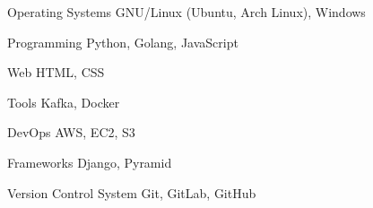 

\begin{cvskills}

  \cvskill
    {Operating Systems} %
    {GNU/Linux (Ubuntu, Arch Linux), Windows } %

  \cvskill
    {Programming} %
    {Python, Golang, JavaScript} %

  \cvskill
    {Web} %
    {HTML, CSS} %

  \cvskill
    {Tools} %
    {Kafka, Docker} %


\cvskill
{DevOps} %
{AWS, EC2, S3} %


  \cvskill
    {Frameworks} %
    {Django, Pyramid} %


  \cvskill
    {Version Control System} %
    {Git, GitLab, GitHub} %


\end{cvskills}

